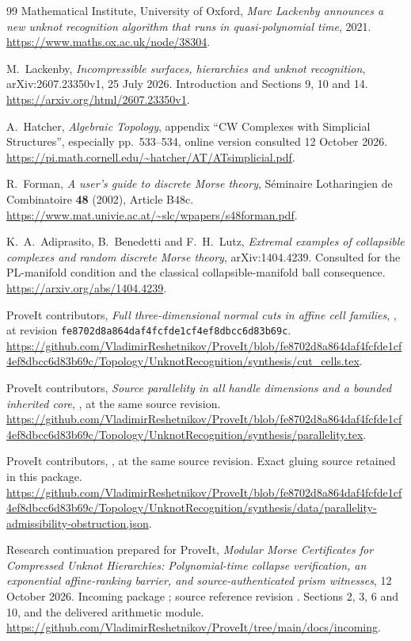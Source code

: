 \documentclass[11pt]{article}
\theoremstyle{definition}\newtheorem{definition}[theorem]{Definition}
\theoremstyle{remark}\newtheorem{remark}[theorem]{Remark}
\newcommand{\code}[1]{\texttt{\detokenize{#1}}}
\newcommand{\sourcepin}{\texttt{fe8702d8a864daf4fcfde1cf4ef8dbcc6d83b69c}}
\begin{document}
\begin{thebibliography}{99}
Mathematical Institute, University of Oxford,
\emph{Marc Lackenby announces a new unknot recognition algorithm that runs in quasi-polynomial time}, 2021.
\url{https://www.maths.ox.ac.uk/node/38304}.

M.~Lackenby, \emph{Incompressible surfaces, hierarchies and unknot recognition}, arXiv:2607.23350v1, 25 July 2026. Introduction and Sections 9, 10 and 14.
\url{https://arxiv.org/html/2607.23350v1}.

A.~Hatcher, \emph{Algebraic Topology}, appendix ``CW Complexes with Simplicial Structures'', especially pp.~533--534, online version consulted 12 October 2026.
\url{https://pi.math.cornell.edu/~hatcher/AT/ATsimplicial.pdf}.

R.~Forman, \emph{A user's guide to discrete Morse theory}, S\'eminaire Lotharingien de Combinatoire \textbf{48} (2002), Article B48c.
\url{https://www.mat.univie.ac.at/~slc/wpapers/s48forman.pdf}.

K.~A.~Adiprasito, B.~Benedetti and F.~H.~Lutz, \emph{Extremal examples of collapsible complexes and random discrete Morse theory}, arXiv:1404.4239. Consulted for the PL-manifold condition and the classical collapsible-manifold ball consequence.
\url{https://arxiv.org/abs/1404.4239}.

ProveIt contributors, \emph{Full three-dimensional normal cuts in affine cell families},
, at revision \sourcepin.
\url{https://github.com/VladimirReshetnikov/ProveIt/blob/fe8702d8a864daf4fcfde1cf4ef8dbcc6d83b69c/Topology/UnknotRecognition/synthesis/cut_cells.tex}.

ProveIt contributors, \emph{Source parallelity in all handle dimensions and a bounded inherited core},
, at the same source revision.
\url{https://github.com/VladimirReshetnikov/ProveIt/blob/fe8702d8a864daf4fcfde1cf4ef8dbcc6d83b69c/Topology/UnknotRecognition/synthesis/parallelity.tex}.

ProveIt contributors,
, at the same source revision. Exact gluing source retained in this package.
\url{https://github.com/VladimirReshetnikov/ProveIt/blob/fe8702d8a864daf4fcfde1cf4ef8dbcc6d83b69c/Topology/UnknotRecognition/synthesis/data/parallelity-admissibility-obstruction.json}.

Research continuation prepared for ProveIt, \emph{Modular Morse Certificates for Compressed Unknot Hierarchies: Polynomial-time collapse verification, an exponential affine-ranking barrier, and source-authenticated prism witnesses}, 12 October 2026.
Incoming package ; source reference revision \code{704600626606a9097cfd89d4e3d2bbc63c8dd1cb}. Sections 2, 3, 6 and 10, and the delivered arithmetic module.
\url{https://github.com/VladimirReshetnikov/ProveIt/tree/main/docs/incoming}.
\end{thebibliography}
\end{document}
